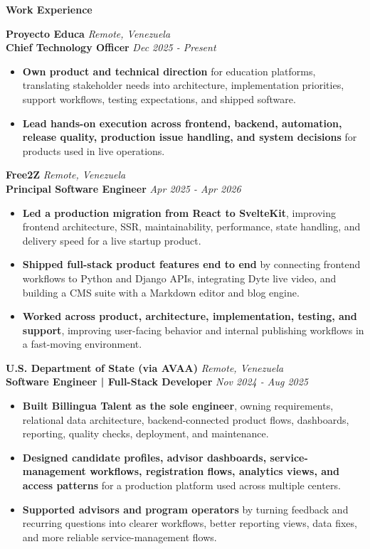 \documentclass[10pt]{article}
\newcommand{\sectiontitle}[1]{%
    \vspace{5pt}
    \begin{center}
        \textbf{#1}
    \end{center}
    \vspace{-6pt}
}
\begin{document}
\sectiontitle{Work Experience}

\textbf{Proyecto Educa} \hfill \textit{Remote, Venezuela} \\
\textbf{Chief Technology Officer} \hfill \textit{Dec 2025 - Present}
\begin{itemize}
    \item \textbf{Own product and technical direction} for education platforms, translating stakeholder needs into architecture, implementation priorities, support workflows, testing expectations, and shipped software.
    \item \textbf{Lead hands-on execution across frontend, backend, automation, release quality, production issue handling, and system decisions} for products used in live operations.
\end{itemize}

\vspace{5pt}
\textbf{Free2Z} \hfill \textit{Remote, Venezuela} \\
\textbf{Principal Software Engineer} \hfill \textit{Apr 2025 - Apr 2026}
\begin{itemize}
    \item \textbf{Led a production migration from React to SvelteKit}, improving frontend architecture, SSR, maintainability, performance, state handling, and delivery speed for a live startup product.
    \item \textbf{Shipped full-stack product features end to end} by connecting frontend workflows to Python and Django APIs, integrating Dyte live video, and building a CMS suite with a Markdown editor and blog engine.
    \item \textbf{Worked across product, architecture, implementation, testing, and support}, improving user-facing behavior and internal publishing workflows in a fast-moving environment.
\end{itemize}

\vspace{5pt}
\textbf{U.S. Department of State (via AVAA)} \hfill \textit{Remote, Venezuela} \\
\textbf{Software Engineer | Full-Stack Developer} \hfill \textit{Nov 2024 - Aug 2025}
\begin{itemize}
    \item \textbf{Built Billingua Talent as the sole engineer}, owning requirements, relational data architecture, backend-connected product flows, dashboards, reporting, quality checks, deployment, and maintenance.
    \item \textbf{Designed candidate profiles, advisor dashboards, service-management workflows, registration flows, analytics views, and access patterns} for a production platform used across multiple centers.
    \item \textbf{Supported advisors and program operators} by turning feedback and recurring questions into clearer workflows, better reporting views, data fixes, and more reliable service-management flows.
\end{itemize}
\end{document}
